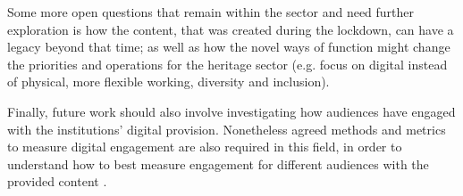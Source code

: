 \documentclass{egpubl}
\begin{document}
Some more open questions that remain within the sector and need further exploration is how the content, that was created during the lockdown, can have a legacy beyond that time; as well as how the novel ways of function might change the priorities and operations for the heritage sector (e.g. focus on digital instead of physical, more flexible working, diversity and inclusion).

Finally, future work should also involve investigating how audiences have engaged with the institutions' digital provision. Nonetheless agreed methods and metrics to measure digital engagement are also required in this field, in order to understand how to best measure engagement for different audiences with the provided content \cite{NetworkofEuropeanMuseumOrganisations20202}. 



\end{document}
